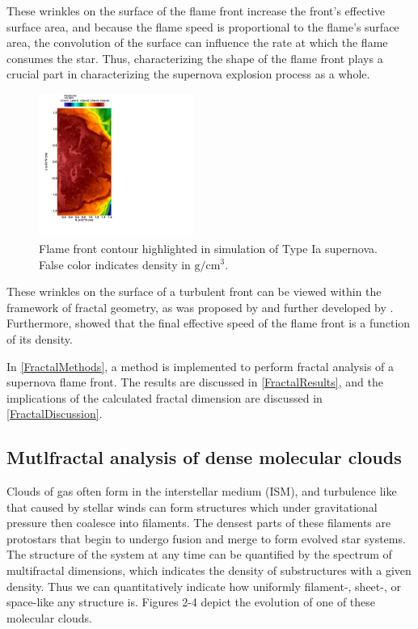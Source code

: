\documentclass[iop]{emulateapj}
\begin{document}
These wrinkles on the surface of the flame front increase the front's effective surface area, and because the flame speed is proportional to the flame's surface area, the convolution of the surface can influence the rate at which the flame consumes the star. Thus, characterizing the shape of the flame front plays a crucial part in characterizing the supernova explosion process as a whole.

\begin{figure}[t]
\begin{center}
\includegraphics[width=0.45\textwidth,clip=true]{Graphics/n7d1r10t15b0002.png}
\caption{Flame front contour highlighted in simulation of Type Ia supernova. False color indicates density in $\mathrm{g/cm^3}$.
\label{f:flamefrontwithcontour}}
\end{center}
\end{figure} 

These wrinkles on the surface of a turbulent front can be viewed within the framework of fractal geometry, as was proposed by \cite{Mandelbrot1975} and further developed by \cite{Timmes1994}. Furthermore, \cite{Timmes1994} showed that the final effective speed of the flame front is a function of its density.

In \textsection \ref{FractalMethods}, a method is implemented to perform fractal analysis of a supernova flame front. The results are discussed in \textsection \ref{FractalResults}, and the implications of the calculated fractal dimension are discussed in \textsection \ref{FractalDiscussion}.


\subsection{Mutlfractal analysis of dense molecular clouds}
Clouds of gas often form in the interstellar medium (ISM), and turbulence like that caused by stellar winds can form structures which under gravitational pressure then coalesce into filaments. The densest parts of these filaments are protostars that begin to undergo fusion and merge to form evolved star systems. The structure of the system at any time can be quantified by the spectrum of multifractal dimensions, which indicates the density of substructures with a given density. Thus we can quantitatively indicate how uniformly filament-, sheet-, or space-like any structure is. Figures 2-4 depict the evolution of one of these molecular clouds.
\end{document}
